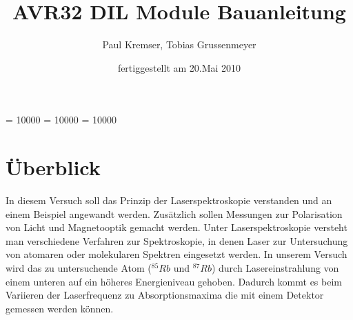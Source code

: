 \documentclass[12pt]{article}
\newcommand{\changefont}[3]{
\fontfamily{#1} \fontseries{#2} \fontshape{#3} \selectfont}
\begin{document}
\clubpenalty = 10000
\widowpenalty = 10000 
\displaywidowpenalty = 10000

\onehalfspacing
\changefont{ptm}{m}{n} 

\begin{titlepage}
\author{Paul Kremser, Tobias Grussenmeyer}
\title{AVR32 DIL Module Bauanleitung}
\date{fertiggestellt am 20.Mai 2010} 
\maketitle
\thispagestyle{empty}
\end{titlepage}


\tableofcontents
\thispagestyle{empty}
\newpage
{}
\section{Überblick}
In diesem Versuch soll das Prinzip der Laserspektroskopie verstanden und an einem Beispiel angewandt werden. Zusätzlich sollen Messungen zur Polarisation von
Licht und Magnetooptik gemacht werden.
Unter Laserspektroskopie versteht man verschiedene Verfahren zur Spektroskopie, in denen Laser zur Untersuchung von atomaren oder molekularen Spektren eingesetzt werden. 
In unserem Versuch wird das zu untersuchende Atom ($^{85}Rb$ und $^{87}Rb$) durch Lasereinstrahlung von einem unteren auf ein höheres Energieniveau gehoben.
Dadurch kommt es beim Variieren der Laserfrequenz zu Absorptionsmaxima die mit einem Detektor gemessen werden können.
\newpage
\end{document}
